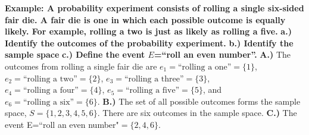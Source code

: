 \documentclass{report}
\begin{document}
    \bigbreak \noindent 
    \begin{mdframed}
        \textbf{Example: A probability experiment consists of rolling a single six-sided fair die. A fair die is one in which each possible outcome is equally likely. For example, rolling a two is just as likely as rolling a five.}
      \bigbreak \noindent 
      \textbf{a.)  Identify the outcomes of the probability experiment. }
      \bigbreak \noindent 
      \textbf{b.) Identify the sample space}
      \bigbreak \noindent 
      \textbf{c.) Define the event $E$=“roll an even number”.}
      \bigbreak \noindent 
      \textbf{A.)} The outcomes from rolling a single fair die are $e_1=\text{``rolling a one''}=\{1\}$, $e_2=\text{``rolling a two''}=\{2\}$, $e_3=\text{``rolling a three''}=\{3\}$, $e_4=\text{``rolling a four''}=\{4\}$, $e_5=\text{``rolling a five''}=\{5\}$, and $e_6=\text{``rolling a six''}=\{6\}$.
      \bigbreak \noindent 
      \textbf{B.)} The set of all possible outcomes forms the sample space, $S=\{1,2,3,4,5,6\}$. There are six outcomes in the sample space.
      \bigbreak \noindent 
      \textbf{C.)} The event E=“roll an even number"$=\{2,4,6\}$.
    \end{mdframed}

    \bigbreak \noindent 
\end{document}
